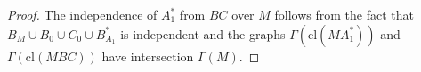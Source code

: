 \documentclass[10pt,a4paper]{amsart}
\begin{document}
\begin{proof}
The independence of $A_1^*$ from $BC$ over $M$ follows from the fact that $B_M \cup B_0 \cup C_0 \cup B_{A_1}^*$ is independent and the graphs $\Gamma(\mathrm{cl}(MA_1^*)) $ and $\Gamma ( \mathrm{cl}(MBC))$ have intersection $\Gamma (M)$. 
\end{proof}
\end{document}
